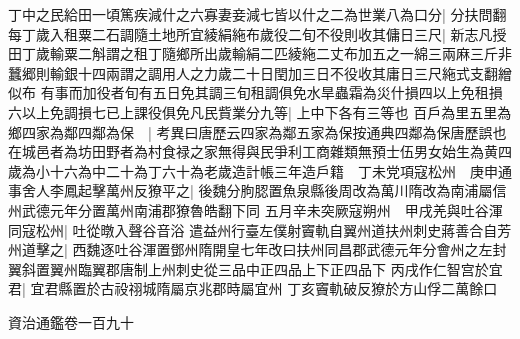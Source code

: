 丁中之民給田一頃篤疾減什之六寡妻妾減七皆以什之二為世業八為口分|{
	分扶問翻}
每丁歲入租粟二石調隨土地所宜綾絹絁布歲役二旬不役則收其傭日三尺|{
	新志凡授田丁歲輸粟二斛謂之租丁隨鄉所出歲輸絹二匹綾絁二丈布加五之一綿三兩麻三斤非蠶郷則輸銀十四兩謂之調用人之力歲二十日閏加三日不役收其庸日三尺絁式支翻繒似布}
有事而加役者旬有五日免其調三旬租調俱免水旱蟲霜為災什損四以上免租損六以上免調損七已上課役俱免凡民貲業分九等|{
	上中下各有三等也}
百戶為里五里為鄉四家為鄰四鄰為保　|{
	考異曰唐歷云四家為鄰五家為保按通典四鄰為保唐歷誤也}
在城邑者為坊田野者為村食禄之家無得與民爭利工商雜類無預士伍男女始生為黄四歲為小十六為中二十為丁六十為老歲造計帳三年造戶籍　丁未党項寇松州　庚申通事舍人李鳳起擊萬州反獠平之|{
	後魏分朐䏰置魚泉縣後周改為萬川隋改為南浦屬信州武德元年分置萬州南浦郡獠魯皓翻下同}
五月辛未突厥寇朔州　甲戌羌與吐谷渾同寇松州|{
	吐從暾入聲谷音浴}
遣益州行臺左僕射竇軌自翼州道扶州刺史蔣善合自芳州道擊之|{
	西魏逐吐谷渾置鄧州隋開皇七年改曰扶州同昌郡武德元年分會州之左封翼斜置翼州臨翼郡唐制上州刺史從三品中正四品上下正四品下}
丙戌作仁智宫於宜君|{
	宜君縣置於古祋祤城隋屬京兆郡時屬宜州}
丁亥竇軌破反獠於方山俘二萬餘口

資治通鑑卷一百九十

